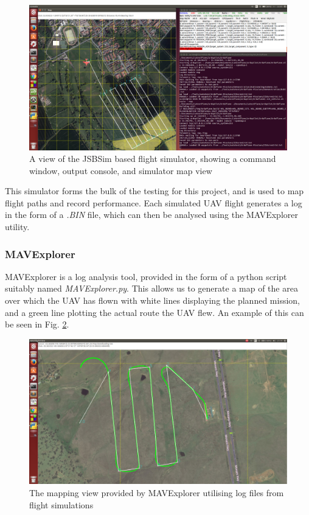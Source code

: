 \begin{figure}[htbp!] 
\centering    
\includegraphics[width=\textwidth]{JSBSim}
\caption[JSBSim simulator]{A view of the JSBSim based flight simulator, showing a command window, output console, and simulator map view}
\label{fig:jsbsim}
\end{figure}

This simulator forms the bulk of the testing for this project, and is used to map flight paths and record performance. Each simulated UAV flight generates a log in the form of a \textit{.BIN} file, which can then be analysed using the MAVExplorer utility.

\subsubsection{MAVExplorer}
\label{intro:mavexplorer}
MAVExplorer is a log analysis tool, provided in the form of a python script suitably named \textit{MAVExplorer.py}. This allows us to generate a map of the area over which the UAV has flown with white lines displaying the planned mission, and a green line plotting the actual route the UAV flew. An example of this can be seen in Fig. \ref{fig:mavexplorer}.

\begin{figure}[htbp!] 
\centering    
\includegraphics[width=\textwidth]{MAVExplorer}
\caption[MAVExplorer example]{The mapping view provided by MAVExplorer utilising log files from flight simulations}
\label{fig:mavexplorer}
\end{figure}

